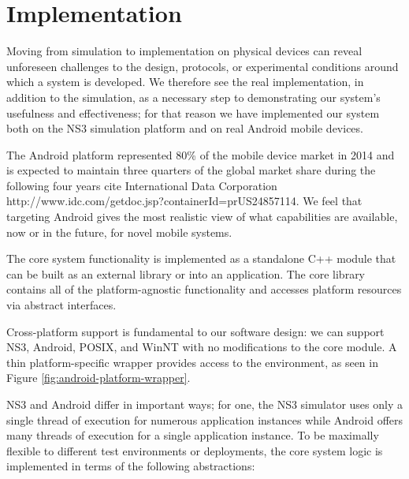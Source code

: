 \documentclass[10pt]{sig-alternate}
\begin{document}
\section{Implementation}

Moving from simulation to implementation on physical devices can reveal unforeseen challenges to the design, protocols, or experimental conditions around which a system is developed. We therefore see the real implementation, in addition to the simulation, as a necessary step to demonstrating our system's usefulness and effectiveness; for that reason we have implemented our system both on the NS3 simulation platform and on real Android mobile devices.

The Android platform represented 80\% of the mobile device market in 2014 and is expected to maintain three quarters of the global market share during the following four years cite International Data Corporation http://www.idc.com/getdoc.jsp?containerId=prUS24857114. We feel that targeting Android gives the most realistic view of what capabilities are available, now or in the future, for novel mobile systems.

The core system functionality is implemented as a standalone C++ module that can be built as an external library or into an application. The core library contains all of the platform-agnostic functionality and accesses platform resources via abstract interfaces.

Cross-platform support is fundamental to our software design: we can support NS3, Android, POSIX, and WinNT with no modifications to the core module. A thin platform-specific wrapper provides access to the environment, as seen in Figure \ref{fig:android-platform-wrapper}.

NS3 and Android differ in important ways; for one, the NS3 simulator uses only a single thread of execution for numerous application instances while Android offers many threads of execution for a single application instance. To be maximally flexible to different test environments or deployments, the core system logic is implemented in terms of the following abstractions:
\end{document}
